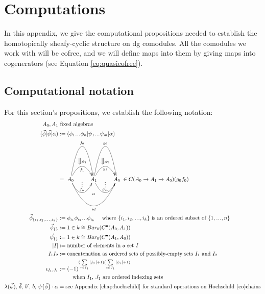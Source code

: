 \chapter{Computations}
In this appendix, we give the 
computational propositions 
needed to establish the 
homotopically sheafy-cyclic structure 
on dg comodules. All the comodules we work 
with will be cofree, 
and we will define maps into them by 
giving maps into cogenerators 
(see Equation \ref{eq:quasicofree}).

\section{Computational notation}
For this section's propositions, we 
establish the following notation:
\begin{align*}
A_0, A_1 
&\textrm{ fixed algebras}\\
(\vec{\phi} | \vec{\psi} | \alpha) 
&:= 
(\phi_1\smdots\phi_n | \psi_1\smdots\psi_m| \alpha)\\
&= 
\xymatrix{
A_0 \ar@/^5pc/[r]^{f_0} 
\ar@/^2pc/[r]^{\big\Downarrow \phi_1}_{f_1} 
\ar@/_2pc/[r]^{\substack{\vdots\\ f_n}}
\ar@/_4pc/[rr]_{id}^{\substack{\alpha \\ \\ \\ \\ }}
& A_1 \ar@/^5pc/[r]^{g_0} 
\ar@/^2pc/[r]^{\big\Downarrow \psi_1}_{g_1} 
\ar@/_2pc/[r]^{\substack{\vdots\\ g_m}}
& A_0
}
\in C(A_0 \to A_1 \to A_0)(g_0f_0)\\
\vec{\phi}_{\{i_1, i_2,\smdots, i_k\}}
&:= 
\phi_{i_1}\phi_{i_2}\smdots\phi_{i_k}
 \quad \textrm{ where $\{i_1, i_2,\smdots, i_k\}$ 
 is an ordered subset of $\{1,\smdots,n\}$}\\
\vec{\phi}_{\{\}}
&:= 
1 \in k \cong Bar_0(C^\bullet(A_0, A_1))\\
\vec{\psi}_{\{\}}
&:= 
1 \in k \cong Bar_0(C^\bullet(A_1, A_0))\\
|I| 
&:=
\textrm{number of elements in a set $I$}\\
I_1I_2 
&:= 
\textrm{concatenation as ordered sets 
of possibly-empty sets $I_1$ and $I_2$}\\
\epsilon_{I_1,J_1} 
&:= 
(-1)^{(\sum \limits_{r \in I_1}|\phi_r|+1)
  (\sum \limits_{s \in J_1}|\psi_s|+1) }\\
&\phantom{{}:={}}  
  \quad \textrm{when $I_1$, $J_1$ are 
  ordered indexing sets}\\
\lambda({\vec{\psi}}),\, \tilde{\delta},\, 
b^\prime,\, b,\, \psi\{\vec{\phi}\}\cdot \alpha
&=
\textrm{see Appendix \ref{chap:hochschild} 
for standard operations on Hochschild (co)chains}\\
\end{align*}
%
